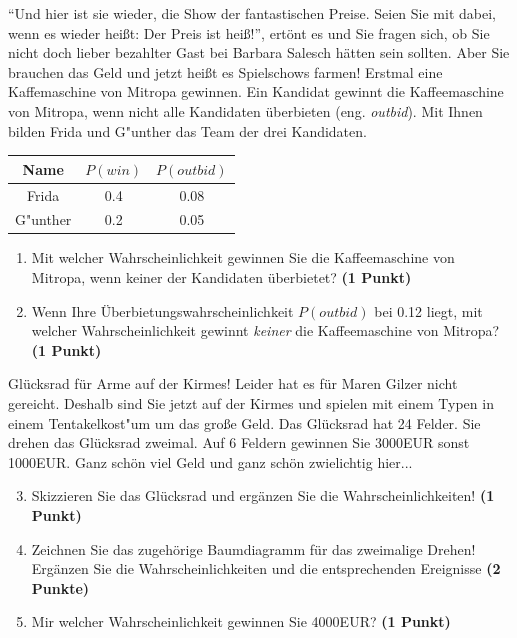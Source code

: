 \documentclass[a4paper, 9pt]{scrartcl}\usepackage[]{graphicx}\usepackage[]{xcolor}
\begin{document}
"`Und hier ist sie wieder, die Show der fantastischen Preise. Seien Sie mit
dabei, wenn es wieder hei{\ss}t: Der Preis ist hei{\ss}!"', ert{\"o}nt es und Sie
fragen sich, ob Sie nicht doch lieber bezahlter Gast bei Barbara Salesch
h{\"a}tten sein sollten. Aber Sie brauchen das Geld und jetzt hei{\ss}t es
Spielschows farmen! Erstmal eine Kaffemaschine von Mitropa
gewinnen. Ein Kandidat gewinnt die Kaffeemaschine von Mitropa, wenn nicht alle
Kandidaten {\"u}berbieten (eng. \textit{outbid}). Mit Ihnen bilden
Frida und G{"u}nther das Team der drei Kandidaten.

\begin{center}
\begin{tabular}{ccc}
  \toprule
  Name & $P(win)$ & $P(outbid)$\\
  \midrule
  Frida & 0.4 & 0.08\\
  G{"u}nther & 0.2 & 0.05 \\
  \bottomrule
\end{tabular}
\end{center}

\begin{enumerate}
\item Mit welcher Wahrscheinlichkeit gewinnen Sie die Kaffeemaschine von
  Mitropa, wenn keiner der Kandidaten {\"u}berbietet? \textbf{(1 Punkt)}
\item Wenn Ihre {\"U}berbietungswahrscheinlichkeit $P(outbid)$ bei
  0.12 liegt, mit welcher Wahrscheinlichkeit gewinnt
  \textit{keiner} die Kaffeemaschine von Mitropa? \textbf{(1 Punkt)}
\end{enumerate}

Gl{\"u}cksrad f{\"u}r Arme auf der Kirmes! Leider hat es f{\"u}r Maren Gilzer nicht
gereicht. Deshalb sind Sie jetzt auf der Kirmes und spielen mit
einem Typen in einem Tentakelkost{"u}m um das gro{\ss}e Geld. Das Gl{\"u}cksrad hat 24
Felder. Sie drehen das Gl{\"u}cksrad zweimal. Auf 6 Feldern
gewinnen Sie 3000EUR sonst 1000EUR. Ganz sch{\"o}n viel Geld
und ganz sch{\"o}n zwielichtig hier...

\begin{enumerate}
  \setcounter{enumi}{2}  
\item Skizzieren Sie das Gl{\"u}cksrad und erg{\"a}nzen Sie die
  Wahrscheinlichkeiten! \textbf{(1 Punkt)}
\item Zeichnen Sie das zugeh{\"o}rige Baumdiagramm f{\"u}r das zweimalige Drehen!
  Erg{\"a}nzen Sie die Wahrscheinlichkeiten und die entsprechenden Ereignisse
  \textbf{(2 Punkte)}
\item Mir welcher Wahrscheinlichkeit gewinnen Sie 4000EUR? \textbf{(1
    Punkt)}
\end{enumerate}
\end{document}
